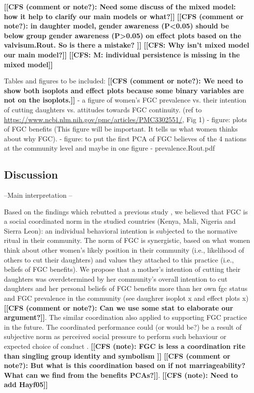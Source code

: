 \documentclass[12pt,]{article}
\newcommand{\comment}[1]{\textbf{[[#1]]}}
\newcommand{\cfcmt}[1]{\comment{CFS: #1}}
\newcommand{\cfonly}[1]{\comment{CFS (note): #1}}
\newcommand{\cf}[1]{\comment{CFS (comment or note?): #1}}
\begin{document}
\cf{Need some discuss of the mixed model:  how it help to clarify our main models or what?}
\cf{in daughter model, gender awareness (P<0.05) should be below group gender awareness (P>0.05) on effect plots based on the valvisum.Rout.  So is there a mistake? }
\cfcmt{Why isn’t mixed model our main model?}
\cfcmt{M: individual persistence is missing in the mixed model}

Tables and figures to be included:
\cf{We need to show both isoplots and effect plots because some binary variables are not on the isoplots.}
- a figure of women’s FGC prevalence vs. their intention of cutting daughters vs. attitudes towards FGC continuity.  (ref to \url{https://www.ncbi.nlm.nih.gov/pmc/articles/PMC3302551/}, Fig 1)
- figure:  plots of FGC benefits (This figure will be important. It tells us what women thinks about why FGC).
- figure: to put the first PCA of FGC believes of the 4 nations at the community level and maybe in one figure
- prevalence.Rout.pdf


\subsection{Discussion}\label{Discussion}

--Main interpretation --

Based on the findings which rebutted a previous study \cite{EffeVogt15}, we believed that FGC is a social coordinated norm \cite{MakieETC} in the studied countries (Kenya, Mali, Nigeria and Sierra Leon):  an individual behavioral intention is subjected to the normative ritual in their community.  The norm of FGC is synergistic, based on what women think about other women’s likely position in their community (i.e., likelihood of others to cut their daughters) and values they attached to this practice (i.e., beliefs of FGC benefits).  We propose that a mother’s intention of cutting their daughters was overdetermined by her community’s overall intention to cut daughters and her personal beliefs of FGC benefits more than her own fgc status and FGC prevalence in the community (see daughrer isoplot x and effect plots x)\cf{Can we use some stat to elaborate our argument?}.  The similar coordination also applied to supporting FGC practice in the future.  The coordinated performance could (or would be?) be a result of subjective norm as perceived social pressure to perform such behaviour or expected choice of conduct \cite{Ajze91}. \cfonly{FGC is less a coordination rite than singling group identity and symbolism \cite{ShelWand11, Youn15}} \cf{But what is this coordination based on if not marriageability?  What can we find from the benefits PCAs?}.  \cfonly{Need to add Hayf05}
\end{document}
